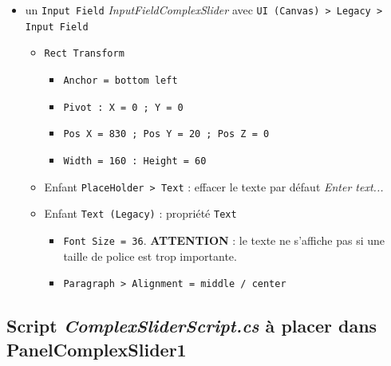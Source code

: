 \documentclass[a4paper,10pt]{article}
\newenvironment{solution}%
{\begin{tcolorbox}[breakable,colback=red!5!white,colframe=red!75!black,title=Solution]}%
{\end{tcolorbox}}
\begin{document}
\begin{solution}
\begin{itemize}
\begin{itemize}
\begin{itemize}
\begin{itemize}
				\item \texttt{Pivot : X = 0.5 ; Y = 0.5}
				\item \texttt{Pos X = 450 ; Pos Y = 50 ; Pos Z = 0}
				\item \texttt{Width = 700 : Height = 60}				
			\end{itemize}
			\item \texttt{Max value} = \textit{100}
			\item Enfant \texttt{Handle Slide Area > Handle} : dans \texttt{Rect Transform}, modifier la propriété \texttt{Width} pour que la poignée du \texttt{Slider} dessine un joli cercle, égale à la hauteur du \texttt{Slider} : $60$.
		\end{itemize}
		\item un \texttt{Input Field} \textit{InputFieldComplexSlider} avec \texttt{UI (Canvas) > Legacy > Input Field}
		\begin{itemize}
			\item \texttt{Rect Transform}
			\begin{itemize}
				\item \texttt{Anchor = bottom left}
				\item \texttt{Pivot : X = 0 ; Y = 0}
				\item \texttt{Pos X = 830 ; Pos Y = 20 ; Pos Z = 0}
				\item \texttt{Width = 160 : Height = 60}				
			\end{itemize}
			\item Enfant \texttt{PlaceHolder > Text} : effacer le texte par défaut \textit{Enter text...}
			\item Enfant \texttt{Text (Legacy)} : propriété \texttt{Text}
			\begin{itemize}
				\item \texttt{Font Size = 36}. \textbf{ATTENTION} : le texte ne s'affiche pas si une taille de police est trop importante.
				\item \texttt{Paragraph > Alignment = middle / center}
			\end{itemize}
		\end{itemize}
	\end{itemize}
	
\end{itemize}

\subsection{Script \textit{ComplexSliderScript.cs} à placer dans PanelComplexSlider1}


\end{solution}
\end{document}
